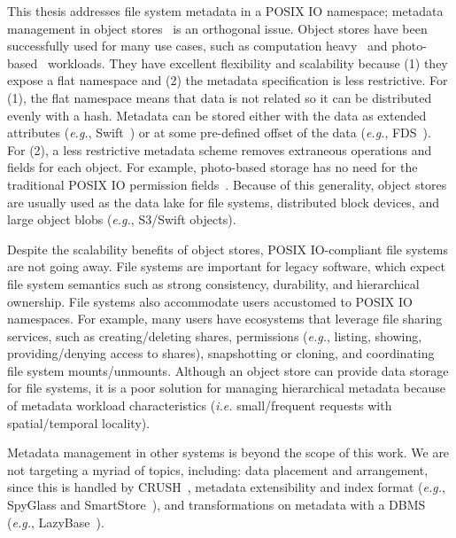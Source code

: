 This thesis addresses file system metadata in a POSIX IO namespace; metadata
management in object stores~\cite{mesnier_objectbased_2003} is an orthogonal
issue.  Object stores have been successfully used for many use cases, such as
computation heavy~\cite{nightingale:osdi2012-fds} and
photo-based~\cite{beaver:osdi2010-haystack} workloads.  They have excellent
flexibility and scalability because (1) they expose a flat namespace and (2)
the metadata specification is less restrictive. For (1), the flat namespace
means that data is not related so it can be distributed evenly with a hash.
Metadata can be stored either with the data as extended attributes ({\it e.g.},
Swift~\cite{toor:nas2012-swift}) or at some pre-defined offset of the data
({\it e.g.}, FDS~\cite{nightingale:osdi2012-fds}). For (2), a less restrictive
metadata scheme removes extraneous operations and fields for each object. For
example, photo-based storage has no need for the traditional POSIX IO
permission fields~\cite{beaver:osdi2010-haystack}. Because of this generality,
object stores are usually used as the data lake for file systems, distributed
block devices, and large object blobs ({\it e.g.}, S3/Swift objects).

Despite the scalability benefits of object stores, POSIX IO-compliant file
systems are not going away. File systems are important for legacy software,
which expect file system semantics such as strong consistency, durability, and
hierarchical ownership.  File systems also accommodate users accustomed to
POSIX IO namespaces. For example, many users have ecosystems that leverage file
sharing services, such as creating/deleting shares, permissions ({\it e.g.},
listing, showing, providing/denying access to shares), snapshotting or
cloning, and coordinating file system mounts/unmounts.  Although an object
store can provide data storage for file systems, it is a poor solution for
managing hierarchical metadata because of metadata workload characteristics
({\it i.e.} small/frequent requests with spatial/temporal locality).

Metadata management in other systems is beyond the scope of this work. We are
not targeting a myriad of topics, including: data placement and arrangement,
since this is handled by CRUSH~\cite{weil:osdi2006-ceph}, metadata
extensibility and index format ({\it e.g.}, SpyGlass\cite{leung:fast2009-spyglass} and
SmartStore~\cite{hua:sc2009-smartstore}), and transformations on metadata with
a DBMS ({\it e.g.}, LazyBase~\cite{cipar:eurosys2012-lazybase}). 




